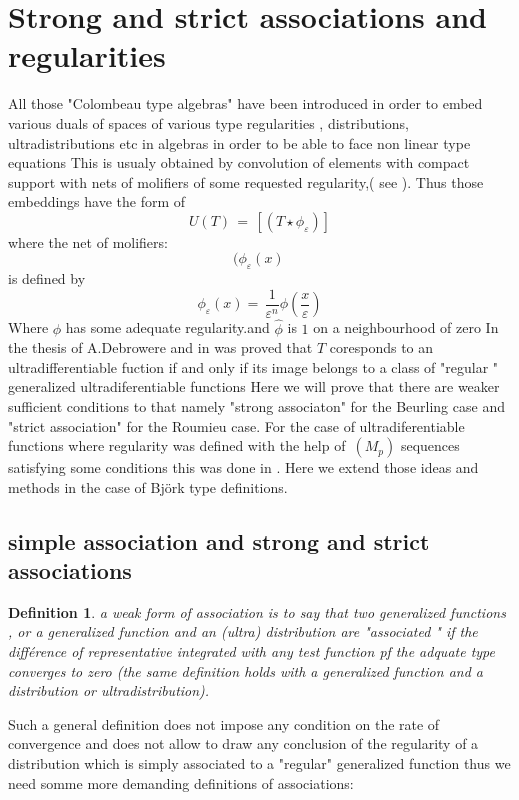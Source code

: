 \documentclass[12pt,a4paper]{amsart}
\newtheorem{definition}[theorem]{Definition}
\begin{document}
\section{Strong and strict associations and regularities} 
 All those "Colombeau type algebras" have been introduced in order to embed various duals of spaces of various type regularities , distributions, ultradistributions etc in algebras in order to be able to face non linear type equations 
  This is usualy obtained by convolution of elements with compact support with nets of molifiers of some requested regularity,( see \cite{D.V.V.}).
   Thus those embeddings have the form of 
  $$ U(T)\,=\,[(T\star\phi_\varepsilon)]$$ where the net of molifiers:
 $$ ( \phi_\varepsilon(x)\,$$ is defined by 
 $$ \phi_\varepsilon(x)=\,
 \frac{1}{\varepsilon^n}\phi(\frac{x}{\varepsilon})$$
 Where $\phi$ has some adequate regularity.and
 $\hat{\phi}$ is $1$ on a neighbourhood of zero 
In the thesis of A.Debrowere and in \cite{D.V.V.} was proved that $T$ coresponds to an ultradifferentiable fuction if and only if its image belongs to a class of "regular " generalized ultradiferentiable functions
 Here we will prove that there are weaker sufficient conditions to that namely "strong associaton" for the Beurling case and "strict association" for the Roumieu case.
  For the case of ultradiferentiable functions where regularity was defined with the help of $\,(M_p)$ sequences satisfying some conditions this was done in \cite{P.R.S.Z}. Here we extend those ideas and methods in the case of Bj\"{o}rk type definitions.
 \subsection{simple association and strong and strict associations}
 \begin{definition}
 a weak form of association is to say that 
 two generalized functions , or a generalized function and an (ultra) distribution are "associated " if the différence of representative integrated with any test function pf the adquate type converges to zero (the same definition holds with a generalized function and a distribution or ultradistribution).
 \end{definition}


  Such a general definition does not impose any condition
  on the rate of convergence and does not allow to draw any conclusion of the regularity of a distribution which is simply associated to a "regular" generalized function thus we need somme more demanding definitions of  associations:
  
\end{document}
